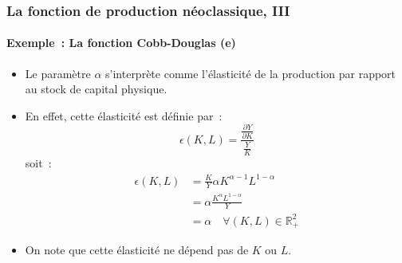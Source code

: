 \documentclass[10pt,notheorems]{beamer}
\theoremstyle{plain}
\theoremstyle{definition} %
\begin{document}
\begin{frame}
  \frametitle{La fonction de production néoclassique, III}
  \framesubtitle{Exemple~: La fonction Cobb-Douglas (e)}

  \medskip

  \begin{itemize}

  \item Le paramètre $\alpha$ s'interprète comme l'élasticité de la production par rapport au stock de capital physique.\newline

  \item En effet, cette élasticité est définie par~:
    \[
      \epsilon(K,L) = \frac{\frac{\partial Y}{\partial K}}{\frac{Y}{K}}
    \]
    soit~:
    \[
      \begin{split}
        \epsilon(K,L) &= \frac{K}{Y}\alpha K^{\alpha-1}L^{1-\alpha}\\
        &= \alpha\frac{K^{\alpha}L^{1-\alpha}}{Y}\\
        &= \alpha \quad \forall (K,L)\in \mathbb R_+^2
      \end{split}
    \]

    \medskip

  \item On note que cette élasticité ne dépend pas de $K$ ou $L$.

  \end{itemize}
\end{frame}
\end{document}
